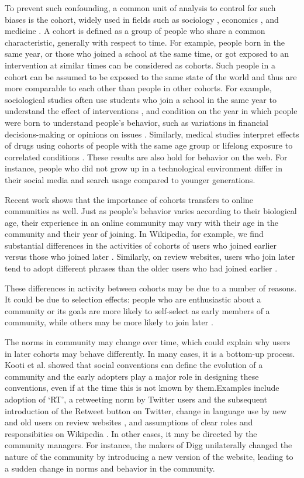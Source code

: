 To prevent such confounding, a common unit of analysis to control for such biases is the cohort, widely used in fields such as sociology \cite{Mason2012,glenn2005}, economics \cite{}, and medicine \cite{}. A cohort is defined as a group of people who share a common characteristic, generally with respect to time. For example,  people born in the same year, or those who joined a school at the same time, or got exposed to an intervention at similar times can be considered as cohorts. Such people in a cohort can be assumed to be exposed to the same state of the world and thus are more comparable to each other than people in other cohorts. For example, sociological studies often use students who join a school in the same year to understand the effect of interventions \cite{}, and condition on the year in which people were born to understand people's  behavior, such as variations in financial decisions-making \cite{attanasio1993} or opinions on issues \cite{} . Similarly, medical studies interpret effects of drugs using cohorts of people with the same age group or lifelong exposure to correlated conditions \cite{levy1996,more}. These results are also hold for behavior on the web. For instance,  people who did not grow up in a technological environment differ in their social media and search usage  compared to younger generations\cite{Correa2010,Beldona2005}. 

Recent work shows that the importance of cohorts transfers to online communities as well. Just as people's behavior varies according to their biological age, their experience in an online community may vary with their age in the community and their year of joining. In Wikipedia, for example, we find substantial differences in the activities of cohorts of users who joined earlier versus those who joined later \cite{Welser2011a}. Similarly, on review websites, users who join later tend to adopt different phrases than the older users who had joined earlier \cite{Danescu-niculescu-mizil2013}.

These differences in activity between cohorts may be due to a number of reasons. It could be due to selection effects: people who are enthusiastic about a community or its goals are more likely to self-select as early members of a community, while others may be more likely to join later \cite{Li2008}. 

The norms in community may change over time, which could explain why users in later cohorts may behave differently. In many cases, it is a bottom-up process. Kooti et al. \cite{Kooti2010} showed that social conventions can define the evolution of a community and the early adopters play a major role in designing these conventions, even if at the time this is not known by them.Examples include adoption of `RT', a retweeting norm by Twitter users and the subsequent introduction of the Retweet button on Twitter, change in language use by new and old users on review websites \cite{Danescu-niculescu-mizil2013}, and assumptions of clear roles and responsibities on Wikipedia \cite{kittur?} . In other cases, it may be directed by the community managers. For instance, the makers of Digg unilaterally changed the nature of the community by introducing a new version of the website, leading to a sudden change in norms and behavior in the community. 

